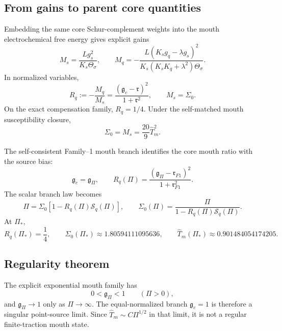 \subsection{From gains to parent core quantities}
\label{subsec:part04-gains-parent-quantities}

Embedding the same core Schur-complement weights into the mouth electrochemical free energy gives explicit gains
\begin{equation}
\label{eq:part04-Ms-Mq-parent}
M_s=\frac{Lg_s^2}{K_s\Theta_\sigma},
\qquad
M_q=-\frac{L(K_sg_q-\lambda g_s)^2}{K_s(K_sK_q+\lambda^2)\Theta_\sigma}.
\end{equation}
In normalized variables,
\begin{equation}
\label{eq:part04-Rq-def}
R_q:=-\frac{M_q}{M_s}
=\frac{(\mathfrak g_c-\mathfrak r)^2}{1+\mathfrak r^2},
\qquad
M_s=\Sigma_0.
\end{equation}
On the exact compensation family, \(R_q=1/4\).  Under the self-matched mouth susceptibility closure,
\begin{equation}
\label{eq:part04-Sigma0-That}
\Sigma_0=M_s=\frac{20}{9}\widehat T_m^2.
\end{equation}

The self-consistent Family--1 mouth branch identifies the core mouth ratio with the source bias:
\begin{equation}
\label{eq:part04-gc-equals-gPi}
\mathfrak g_c=\mathfrak g_\Pi,
\qquad
R_q(\Pi)=\frac{(\mathfrak g_\Pi-\mathfrak r_{F1})^2}{1+\mathfrak r_{F1}^2}.
\end{equation}
The scalar branch law becomes
\begin{equation}
\label{eq:part04-selfconsistent-Pi-law}
\Pi=\Sigma_0\left[1-R_q(\Pi)\mathcal S_q(\Pi)\right],
\qquad
\Sigma_0(\Pi)=\frac{\Pi}{1-R_q(\Pi)\mathcal S_q(\Pi)}.
\end{equation}
At \(\Pi_*\),
\begin{equation}
\label{eq:part04-canonical-mouth-values}
R_q(\Pi_*)=\frac14,
\qquad
\Sigma_0(\Pi_*)\approx1.80594111095636,
\qquad
\widehat T_m(\Pi_*)\approx0.901484054174205.
\end{equation}

\subsection{Regularity theorem}
\label{subsec:part04-regularity-theorem}

The explicit exponential mouth family has
\begin{equation}
0<\mathfrak g_\Pi<1\qquad(\Pi>0),
\end{equation}
and \(\mathfrak g_\Pi\to1\) only as \(\Pi\to\infty\).  The equal-normalized branch \(\mathfrak g_c=1\) is therefore a singular point-source limit.  Since \(\widehat T_m\sim C\Pi^{1/2}\) in that limit, it is not a regular finite-traction mouth state.

